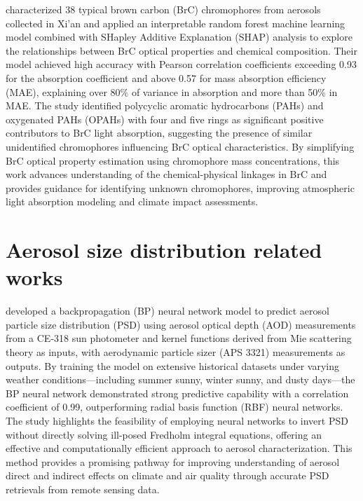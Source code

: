 \documentclass[11pt]{article}
\begin{document}
\citet{wang2024predictions} characterized 38 typical brown carbon (BrC) chromophores from aerosols collected in Xi’an and applied an interpretable random forest machine learning model combined with SHapley Additive Explanation (SHAP) analysis to explore the relationships between BrC optical properties and chemical composition. Their model achieved high accuracy with Pearson correlation coefficients exceeding 0.93 for the absorption coefficient and above 0.57 for mass absorption efficiency (MAE), explaining over 80\% of variance in absorption and more than 50\% in MAE. The study identified polycyclic aromatic hydrocarbons (PAHs) and oxygenated PAHs (OPAHs) with four and five rings as significant positive contributors to BrC light absorption, suggesting the presence of similar unidentified chromophores influencing BrC optical characteristics. By simplifying BrC optical property estimation using chromophore mass concentrations, this work advances understanding of the chemical-physical linkages in BrC and provides guidance for identifying unknown chromophores, improving atmospheric light absorption modeling and climate impact assessments.

\section{Aerosol size distribution related works}
\citet{ren2020prediction} developed a backpropagation (BP) neural network model to predict aerosol particle size distribution (PSD) using aerosol optical depth (AOD) measurements from a CE-318 sun photometer and kernel functions derived from Mie scattering theory as inputs, with aerodynamic particle sizer (APS 3321) measurements as outputs. By training the model on extensive historical datasets under varying weather conditions—including summer sunny, winter sunny, and dusty days—the BP neural network demonstrated strong predictive capability with a correlation coefficient of 0.99, outperforming radial basis function (RBF) neural networks. The study highlights the feasibility of employing neural networks to invert PSD without directly solving ill-posed Fredholm integral equations, offering an effective and computationally efficient approach to aerosol characterization. This method provides a promising pathway for improving understanding of aerosol direct and indirect effects on climate and air quality through accurate PSD retrievals from remote sensing data.
\end{document}
